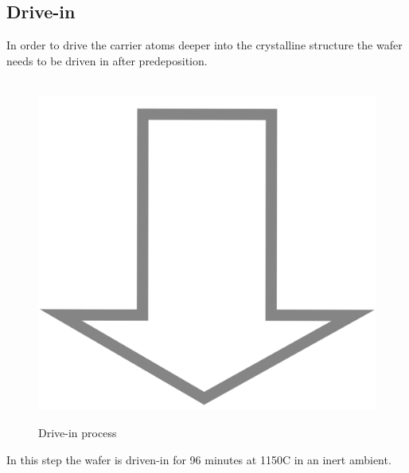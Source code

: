 \subsection{Drive-in}
In order to drive the carrier atoms deeper into the crystalline structure the wafer needs to be driven in after predeposition.
\begin{figure}[H]
	\centering
	\begin{tikzpicture}[node distance = 3cm, auto, thick,scale=\CrossSectionOnly, every node/.style={transform shape}]
		
	\end{tikzpicture} \\
	\includegraphics[scale=0.01]{down_arrow.png} \\
	\begin{tikzpicture}[node distance = 3cm, auto, thick,scale=\CrossSectionOnly, every node/.style={transform shape}]
		
	\end{tikzpicture}
	\caption{Drive-in process}
\end{figure}
In this step the wafer is  driven-in for 96 minutes at 1150\degree C in an inert ambient.

\newpage

